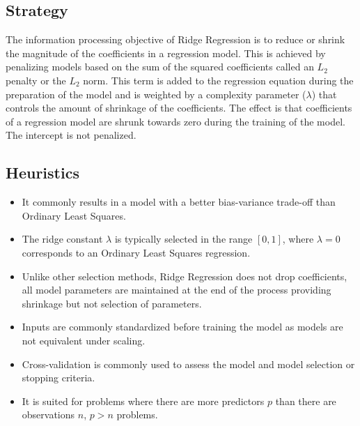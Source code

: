 \subsection{Strategy}
The information processing objective of Ridge Regression is to reduce or shrink the magnitude of the coefficients in a regression model.
This is achieved by penalizing models based on the sum of the squared coefficients called an $L_2$ penalty or the $L_2$ norm. This term is added to the regression equation during the preparation of the model and is weighted by a complexity parameter ($\lambda$) that controls the amount of shrinkage of the coefficients. 
The effect is that coefficients of a regression model are shrunk towards zero during the training of the model. The intercept is not penalized.

\subsection{Heuristics}

\begin{itemize}
	\item It commonly results in a model with a better bias-variance trade-off than Ordinary Least Squares.
	\item The ridge constant $\lambda$ is typically selected in the range $[0,1]$, where $\lambda=0$ corresponds to an Ordinary Least Squares regression.
	\item Unlike other selection methods, Ridge Regression does not drop coefficients, all model parameters are maintained at the end of the process providing shrinkage but not selection of parameters.
	\item Inputs are commonly standardized before training the model as models are not equivalent under scaling.
	\item Cross-validation is commonly used to assess the model and model selection or stopping criteria.
	\item It is suited for problems where there are more predictors $p$ than there are observations $n$, $p>n$ problems.
\end{itemize}

